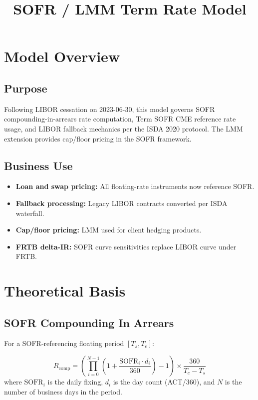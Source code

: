 \documentclass{apex_mdd}
\title{SOFR / LMM Term Rate Model}
\begin{document}
\maketitle
\statusbadge

\tableofcontents
\newpage

\section{Model Overview}

\subsection{Purpose}
Following LIBOR cessation on 2023-06-30, this model governs SOFR compounding-in-arrears rate computation, Term SOFR CME reference rate usage, and LIBOR fallback mechanics per the ISDA 2020 protocol. The LMM extension provides cap/floor pricing in the SOFR framework.

\subsection{Business Use}
\begin{itemize}
  \item \textbf{Loan and swap pricing:} All floating-rate instruments now reference SOFR.
  \item \textbf{Fallback processing:} Legacy LIBOR contracts converted per ISDA waterfall.
  \item \textbf{Cap/floor pricing:} LMM used for client hedging products.
  \item \textbf{FRTB delta-IR:} SOFR curve sensitivities replace LIBOR curve under FRTB.
\end{itemize}

\section{Theoretical Basis}

\subsection{SOFR Compounding In Arrears}
For a SOFR-referencing floating period $[T_s, T_e]$:
\begin{formulabox}
\[
  R_{\mathrm{comp}} = \left(\prod_{i=0}^{N-1}\!\left(1 + \frac{\mathrm{SOFR}_i \cdot d_i}{360}\right) - 1\right)\times\frac{360}{T_e - T_s}
\]
where $\mathrm{SOFR}_i$ is the daily fixing, $d_i$ is the day count (ACT/360), and $N$ is the number of business days in the period.
\end{formulabox}
\end{document}
